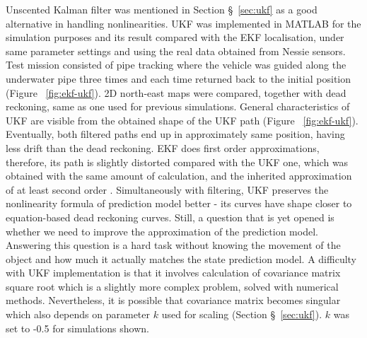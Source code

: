 Unscented Kalman filter was mentioned in Section \S~\ref{sec:ukf} as a good alternative in handling nonlinearities. UKF was implemented in MATLAB for the simulation purposes and its result compared with the EKF localisation, under same parameter settings and using the real data obtained from Nessie sensors. Test mission consisted of pipe tracking where the vehicle was guided along the underwater pipe three times and each time returned back to the initial position (Figure ~\ref{fig:ekf-ukf}). 2D north-east maps were compared, together with dead reckoning, same as one used for previous simulations. General characteristics of UKF are visible from the obtained shape of the UKF path (Figure ~\ref{fig:ekf-ukf}). Eventually, both filtered paths end up in approximately same position, having less drift than the dead reckoning. EKF does first order approximations, therefore, its path is slightly distorted compared with the UKF one, which was obtained with the same amount of calculation, and the inherited approximation of at least second order \cite{julier96}. Simultaneously with filtering, UKF preserves the nonlinearity formula of prediction model better - its curves have shape closer to equation-based dead reckoning curves. Still, a question that is yet opened is whether we need to improve the approximation of the prediction model. Answering this question is a hard task without knowing the movement of the object and how much it actually matches the state prediction model. A difficulty with UKF implementation is that it involves calculation of covariance matrix square root which is a slightly more complex problem, solved with numerical methods. Nevertheless, it is possible that covariance matrix becomes singular which also depends on parameter $k$ used for scaling (Section \S~\ref{sec:ukf}). $k$ was set to -0.5 for simulations shown.        
\begin{figure}%
  \centering
\end{figure}